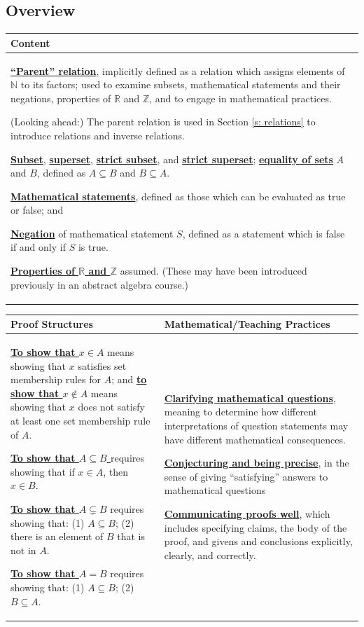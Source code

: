 \documentclass[11pt]{article}
\newcommand{\R}{\mathbb{R}}
\newcommand{\N}{\mathbb{N}}
\newcommand{\Z}{\mathbb{Z}}
\renewcommand\subset\subseteq
\renewcommand\emph[1]{\underline{\bf{#1}}} %
\theoremstyle{definition}
\begin{document}
\subsection{Overview}
 
 \vspace*{-16pt}
\begin{tabular}{L{6.5in}} 
{\bf Content} \\ \hline \parskip4pt
\emph{``Parent'' relation}, implicitly defined as a relation which assigns elements of $\N$ to its factors; used to examine subsets, mathematical statements and their negations, properties of $\R$ and $\Z$, and to engage in mathematical practices. 

(Looking ahead:) The parent relation is used in Section \ref{s: relations} to introduce relations and inverse relations.

\emph{Subset}, \emph{superset}, \emph{strict subset}, and \emph{strict superset}; \emph{equality of sets} $A$ and $B$, defined as $A\subset B$ and $B\subset A$.

\emph{Mathematical statements}, defined as those which can be evaluated as true or false; and 

\emph{Negation} of mathematical statement $S$, defined as a statement which is false if and only if $S$ is true.

\emph{Properties of $\R$ and $\Z$} assumed. (These may have been introduced previously in an abstract algebra course.)
\end{tabular}

\begin{tabular}{L{3.2in}|L{3.2in}}
{\bf Proof Structures} & {\bf Mathematical/Teaching Practices} \\ 
\hline \parskip4pt
\emph{To show that $x\in A$} means showing that $x$ satisfies set membership rules for $A$; and \emph{to show that $x\notin A$} means showing that $x$ does not satisfy at least one set membership rule of $A$.

\emph{To show that $A\subset B$ }requires showing that if $x\in A$, then $x\in B$.

\emph{To show that $A\subsetneq B$} requires showing that: (1) $A\subset B$; (2) there is an element of $B$ that is not in $A$.

\emph{To show that $A=B$} requires showing that: (1) $A\subset B$; (2) $B\subset A$.
&
\parskip6pt
\emph{Clarifying mathematical questions}, meaning to determine how different interpretations of question statements may have different mathematical consequences.
 
\emph{Conjecturing and being precise}, in the sense of giving ``satisfying'' answers to mathematical questions

\emph{Communicating proofs well}, which includes specifying claims, the body of the proof, and givens and conclusions explicitly, clearly, and correctly.
\end{tabular}
\end{document}
